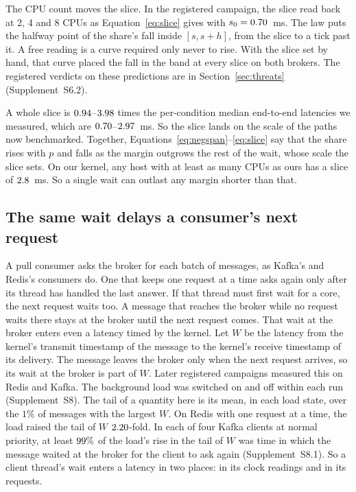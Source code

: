 \documentclass[10pt,journal,compsoc]{IEEEtran}
\newcommand{\kafka}{Kafka}
\newcommand{\redis}{Redis}
\begin{document}
The CPU count moves the slice. In the registered campaign, the slice read back at 2, 4 and 8 CPUs
as Equation~\ref{eq:slice} gives with $s_0 = 0.70$~ms. The law puts the halfway point
of the share's fall inside $[s, s + h]$, from the slice to a tick past it. A free reading is a curve required only never to rise. With the slice set by hand, that curve placed the fall in the band at
every slice on both brokers. The registered verdicts on these predictions are in
Section~\ref{sec:threats} (Supplement~S6.2).

A whole slice is $0.94$--$3.98$ times the per-condition median
end-to-end latencies we measured, which are $0.70$--$2.97$~ms. So the slice
lands on the scale of the paths now benchmarked. Together, Equations~\ref{eq:negspan}--\ref{eq:slice}
say that the share rises with $p$ and falls as the margin outgrows the rest of the wait, whose scale
the slice sets. On our kernel, any host with at least as many CPUs as ours has a slice of
$2.8$~ms. So a single wait can outlast any margin shorter than that.

\subsection{The same wait delays a consumer's next request}
\label{sec:laterequest}
A pull consumer asks the broker for each batch of messages, as \kafka{}'s and \redis{}'s consumers
do. One that keeps one request at a time asks again only after its thread has handled the last
answer. If that thread must first wait for a core, the next request waits too. A message that
reaches the broker while no request waits there
stays at the broker until the next request comes. That wait at the broker enters even a latency
timed by the kernel. Let $W$ be the latency from the kernel's transmit timestamp of the message to
the kernel's receive timestamp of its delivery. The message leaves the broker only when the next
request arrives, so its wait at the broker is part of $W$. Later registered campaigns measured this on \redis{} and \kafka{}. The background load was switched on and off within each run (Supplement~S8). The tail of
a quantity here is its mean, in each load state, over the $1\%$ of messages with the largest $W$.
On \redis{} with one request at a time, the load raised the tail of $W$ $2.20$-fold. In each of four \kafka{} clients at normal priority, at least $99\%$ of the load's rise in the tail of $W$ was time in which the message waited at the broker for the client to ask again (Supplement~S8.1). So a client thread's wait enters a
latency in two places: in its clock readings and in its requests.
\end{document}
